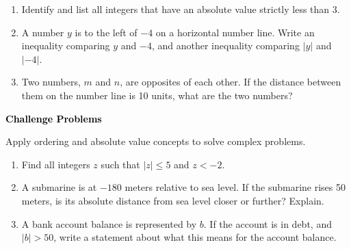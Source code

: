 \documentclass[12pt, letterpaper, fleqn]{article}
\begin{document}
\begin{enumerate}[itemsep=2.2cm, leftmargin=0.6cm]

\item Identify and list all integers that have an absolute value strictly less than 3.

\vspace{2cm}

\item A number $y$ is to the left of $-4$ on a horizontal number line. Write an inequality comparing $y$ and $-4$, and another inequality comparing $|y|$ and $|-4|$.

\vspace{2cm}

\item Two numbers, $m$ and $n$, are opposites of each other. If the distance between them on the number line is 10 units, what are the two numbers?

\vspace{2cm}

\end{enumerate}

\newpage

\begin{tcolorbox}[colback=black!10]
\large\textcolor{black}{\textbf{Challenge Problems}}
\end{tcolorbox}

\noindent
Apply ordering and absolute value concepts to solve complex problems.

\vspace{3mm}

\begin{enumerate}[itemsep=2.4cm, leftmargin=0.6cm]

\item Find all integers $z$ such that $|z| \le 5$ and $z < -2$.

\vspace{2.3cm}

\item A submarine is at $-180$ meters relative to sea level. If the submarine rises 50 meters, is its absolute distance from sea level closer or further? Explain.

\vspace{2.3cm}

\item A bank account balance is represented by $b$. If the account is in debt, and $|b| > 50$, write a statement about what this means for the account balance.

\vspace{2.5cm}

\end{enumerate}
\end{document}
